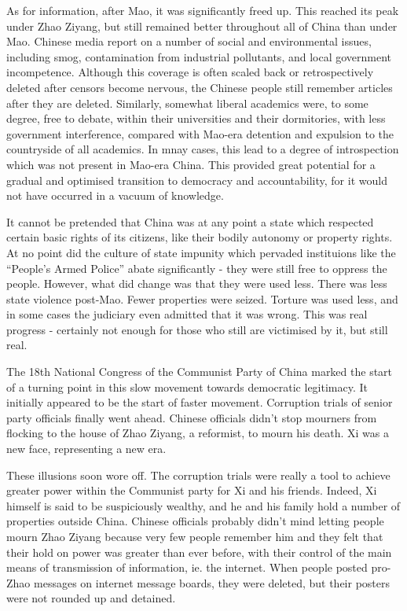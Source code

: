 \documentclass[10pt,a4paper,twocolumn]{article}
\newcounter{count}
\begin{document}
As for information, after Mao, it was significantly freed up. This reached its peak under Zhao Ziyang, but still remained better throughout all of China than under Mao. Chinese media report on a number of social and environmental issues, including smog, contamination from industrial pollutants, and local government incompetence. Although this coverage is often scaled back or retrospectively deleted after censors become nervous, the Chinese people still remember articles after they are deleted. Similarly, somewhat liberal academics were, to some degree, free to debate, within their universities and their dormitories, with less government interference, compared with Mao-era detention and expulsion to the countryside of all academics. In mnay cases, this lead to a degree of introspection which was not present in Mao-era China. This provided great potential for a gradual and optimised transition to democracy and accountability, for it would not have occurred in a vacuum of knowledge.

It cannot be pretended that China was at any point a state which respected certain basic rights of its citizens, like their bodily autonomy or property rights. At no point did the culture of state impunity which pervaded instituions like the ``People's Armed Police'' abate significantly - they were still free to oppress the people. However, what did change was that they were used less. There was less state violence post-Mao. Fewer properties were seized. Torture was used less, and in some cases the judiciary even admitted that it was wrong. This was real progress - certainly not enough for those who still are victimised by it, but still real.

The 18th National Congress of the Communist Party of China marked the start of a turning point in this slow movement towards democratic legitimacy. It initially appeared to be the start of faster movement. Corruption trials of senior party officials finally went ahead. Chinese officials didn't stop mourners from flocking to the house of Zhao Ziyang, a reformist, to mourn his death. Xi was a new face, representing a new era.

These illusions soon wore off. The corruption trials were really a tool to achieve greater power within the Communist party for Xi and his friends. Indeed, Xi himself is said to be suspiciously wealthy, and he and his family hold a number of properties outside China. Chinese officials probably didn't mind letting people mourn Zhao Ziyang because very few people remember him and they felt that their hold on power was greater than ever before, with their control of the main means of transmission of information, ie. the internet. When people posted pro-Zhao messages on internet message boards, they were deleted, but their posters were not rounded up and detained.
\end{document}
